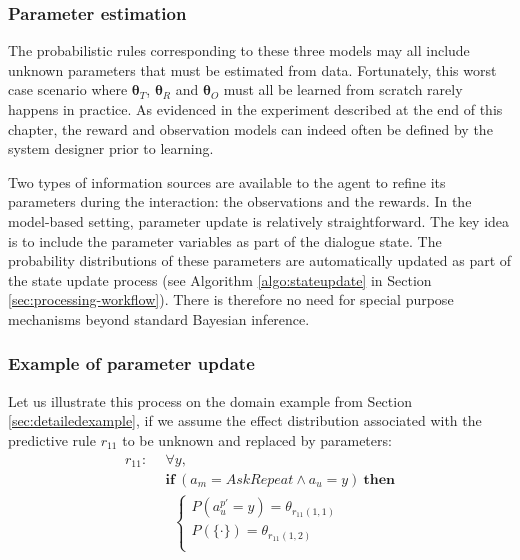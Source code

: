 \subsubsection*{Parameter estimation}
The probabilistic rules corresponding to these three models may all include unknown parameters that must be estimated from data.  Fortunately, this worst case scenario where $\boldsymbol\theta_T$, $\boldsymbol\theta_R$ and $\boldsymbol\theta_O$ must all be learned from scratch rarely happens in practice. As evidenced in the experiment described at the end of this chapter, the reward and observation models can indeed often be defined by the system designer prior to learning. 

Two types of information sources are available to the agent to refine its parameters during the interaction: the observations and the rewards.  In the model-based setting, parameter update is relatively straightforward.  The key idea is to include the parameter variables as part of the dialogue state.  The probability distributions of these parameters are automatically updated as part of the state update process (see Algorithm \ref{algo:stateupdate} in Section \ref{sec:processing-workflow}). There is therefore no need for special purpose mechanisms beyond standard Bayesian inference.

\subsubsection*{Example of parameter update}

Let us illustrate this process on the domain example from Section \ref{sec:detailedexample}, if we assume the effect distribution associated with the predictive rule $r_{11}$ to be unknown and replaced by parameters: 
\begin{align*}
r_{11}: \ \ & \forall y, \\ 
& \textbf{if} \ (a_m = \mathit{AskRepeat} \land a_u=y) \ \textbf{then} \\ 
& \; \;  \begin{cases} 
P(a_{u}^{p\prime} = y) = \theta_{r_{11}(1,1)} \\ 
P(\{\cdot\}) = \theta_{r_{11}(1,2)} \\ 
\end{cases}
\end{align*}



